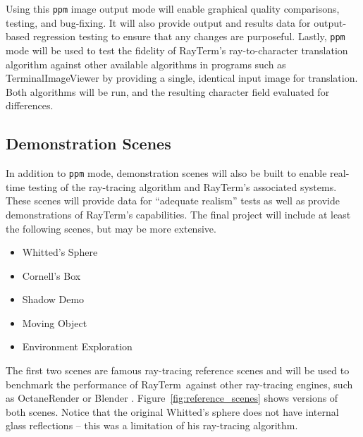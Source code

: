 \documentclass[11pt]{article}
\newcommand{\name}{{\sc RayTerm}}
\begin{document}
Using this \texttt{ppm} image output mode will enable graphical quality comparisons, testing, and bug-fixing.
It will also provide output and results data for output-based regression testing to ensure that any changes are purposeful.
Lastly, \texttt{ppm} mode will be used to test the fidelity of \name's ray-to-character translation algorithm against other available algorithms in programs such as TerminalImageViewer by providing a single, identical input image for translation.
Both algorithms will be run, and the resulting character field evaluated for differences.


\subsection{Demonstration Scenes}
\label{sec:evaluate:demo_scenes}

In addition to \texttt{ppm} mode, demonstration scenes will also be built to enable real-time testing of the ray-tracing algorithm and \name's associated systems.
These scenes will provide data for ``adequate realism'' tests as well as provide demonstrations of \name's capabilities.
The final project will include at least the following scenes, but may be more extensive.

\begin{itemize}
  \setlength\itemsep{-0.25em}
  \item Whitted's Sphere
  \item Cornell's Box
  \item Shadow Demo
  \item Moving Object
  \item Environment Exploration
\end{itemize}

The first two scenes are famous ray-tracing reference scenes and will be used to benchmark the performance of \name\ against other ray-tracing engines, such as OctaneRender \cite{octane} or Blender \cite{blender}.
Figure~\ref{fig:reference_scenes} shows versions of both scenes.
Notice that the original Whitted's sphere does not have internal glass reflections -- this was a limitation of his ray-tracing algorithm.
\end{document}
